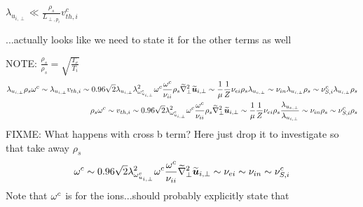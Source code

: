 $\lambda_{u_{i,\perp}} \ll \frac{\rho_s}{L_{\perp, p_i}}v^c_{th,i}$

...actually looks like we need to state it for the other terms as well

NOTE: $\frac{\rho_s}{\rho_s}=\sqrt{\frac{T_e}{T_i}}$
%
\begin{align*}
 \lambda_{u_{i,\perp}}
 \rho_s
 \om^c
%
 \sim
 \lambda_{u_{i,\perp}}
 v_{th,i}
%
 \sim
0.96\sqrt{2}
 \lambda_{u_{i,\perp}}
\lambda_{\om^c_{u_{i,\perp}}}^2
 \om^c
\frac{\om^c}{\nu_{ii} }
\rho_s
\wt{\grad}_\perp^2\wt{\ve{u}}_{i,\perp}
%
 \sim
\frac{1}{\mu}
\frac{1}{Z}
\nu_{ei}
\rho_s
\lambda_{u_{e,\perp}}
%
 \sim
\nu_{i n}\lambda_{u_{i,\perp}}\rho_s
%
 \sim
\nu^c_{S,i}\lambda_{u_{i,\perp}}\rho_s
\\
%
%
%
 \rho_s
 \om^c
%
 \sim
 v_{th,i}
%
 \sim
0.96\sqrt{2}
\lambda_{\om^c_{u_{i,\perp}}}^2
 \om^c
\frac{\om^c}{\nu_{ii} }
\rho_s
\wt{\grad}_\perp^2\wt{\ve{u}}_{i,\perp}
%
 \sim
\frac{1}{\mu}
\frac{1}{Z}
\nu_{ei}
\rho_s
\frac{\lambda_{u_{e,\perp}}}{\lambda_{u_{i,\perp}}}
%
 \sim
\nu_{i n}
\rho_s
%
 \sim
\nu^c_{S,i}
\rho_s
\\
\end{align*}
%
FIXME: What happens with cross b term? Here just drop it to investigate
so that take away $\rho_s$
%
\begin{align*}
 \om^c
%
 \sim
0.96\sqrt{2}
\lambda_{\om^c_{u_{i,\perp}}}^2
 \om^c
\frac{\om^c}{\nu_{ii} }
\wt{\grad}_\perp^2\wt{\ve{u}}_{i,\perp}
%
 \sim
\nu_{ei}
%
 \sim
\nu_{i n}
%
 \sim
\nu^c_{S,i}
\end{align*}
%
Note that $\omega^c$ is for the ions...should probably explicitly state that
